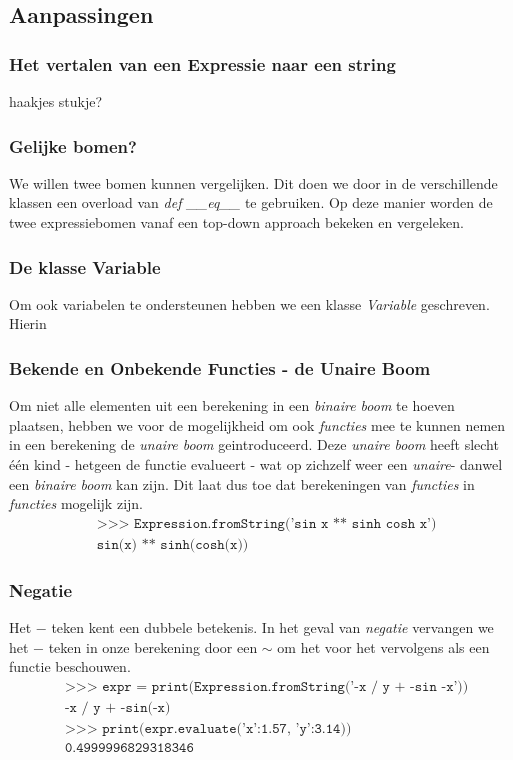 \documentclass[12pt]{article}
\begin{document}
\subsection{Aanpassingen}

\subsubsection*{Het vertalen van een Expressie naar een string}
haakjes stukje?

\subsubsection*{Gelijke bomen?}
We willen twee bomen kunnen vergelijken. Dit doen we door in de verschillende klassen een overload van \textit{def \_\_eq\_\_} te gebruiken. Op deze manier worden de twee expressiebomen vanaf een top-down approach bekeken en vergeleken.

\subsubsection*{De klasse Variable}
Om ook variabelen te ondersteunen hebben we een klasse \textit{Variable} geschreven. Hierin 



\subsubsection*{Bekende en Onbekende Functies - de Unaire Boom}
Om niet alle elementen uit een berekening in een \textit{binaire boom} te hoeven plaatsen, hebben we voor de mogelijkheid om ook \textit{functies} mee te kunnen nemen in een berekening de \textit{unaire boom} geintroduceerd. Deze \textit{unaire boom} heeft slecht \'e\'en kind - hetgeen de functie evalueert - wat op zichzelf weer een \textit{unaire}- danwel een \textit{binaire boom} kan zijn. Dit laat dus toe dat berekeningen van \textit{functies} in \textit{functies} mogelijk zijn.
\begin{align*}
&\texttt{>>> Expression.fromString('sin x ** sinh cosh x')}\\
&\texttt{sin(x) ** sinh(cosh(x))}
\end{align*}

\subsubsection*{Negatie}
Het $-$ teken kent een dubbele betekenis. In het geval van \textit{negatie} vervangen we het $-$ teken in onze berekening door een $\sim$ om het voor het vervolgens als een functie beschouwen. 
\begin{align*}
&\texttt{>>> expr =  print(Expression.fromString('-x / y + -sin -x'))}\\
&\texttt{-x / y + -sin(-x)}\\
&\texttt{>>> print(expr.evaluate({'x':1.57, 'y':3.14}))}\\
&\texttt{0.4999996829318346}
\end{align*}
\end{document}

